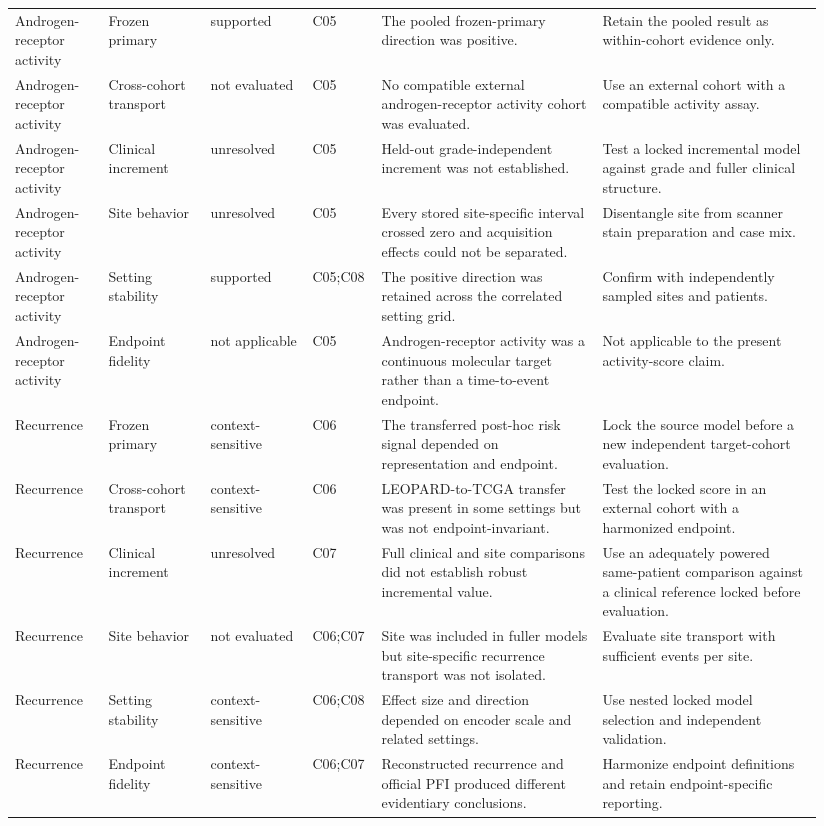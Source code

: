 \begin{longtable}{@{}p{0.11\linewidth}p{0.12\linewidth}p{0.12\linewidth}p{0.07\linewidth}p{0.26\linewidth}p{0.26\linewidth}@{}}
Androgen-receptor activity & Frozen primary & supported & C05 & The pooled frozen-primary direction was positive. & Retain the pooled result as within-cohort evidence only. \\
Androgen-receptor activity & Cross-cohort transport & not evaluated & C05 & No compatible external androgen-receptor activity cohort was evaluated. & Use an external cohort with a compatible activity assay. \\
Androgen-receptor activity & Clinical increment & unresolved & C05 & Held-out grade-independent increment was not established. & Test a locked incremental model against grade and fuller clinical structure. \\
Androgen-receptor activity & Site behavior & unresolved & C05 & Every stored site-specific interval crossed zero and acquisition effects could not be separated. & Disentangle site from scanner stain preparation and case mix. \\
Androgen-receptor activity & Setting stability & supported & C05;C08 & The positive direction was retained across the correlated setting grid. & Confirm with independently sampled sites and patients. \\
Androgen-receptor activity & Endpoint fidelity & not applicable & C05 & Androgen-receptor activity was a continuous molecular target rather than a time-to-event endpoint. & Not applicable to the present activity-score claim. \\
Recurrence & Frozen primary & context-sensitive & C06 & The transferred post-hoc risk signal depended on representation and endpoint. & Lock the source model before a new independent target-cohort evaluation. \\
Recurrence & Cross-cohort transport & context-sensitive & C06 & LEOPARD-to-TCGA transfer was present in some settings but was not endpoint-invariant. & Test the locked score in an external cohort with a harmonized endpoint. \\
Recurrence & Clinical increment & unresolved & C07 & Full clinical and site comparisons did not establish robust incremental value. & Use an adequately powered same-patient comparison against a clinical reference locked before evaluation. \\
Recurrence & Site behavior & not evaluated & C06;C07 & Site was included in fuller models but site-specific recurrence transport was not isolated. & Evaluate site transport with sufficient events per site. \\
Recurrence & Setting stability & context-sensitive & C06;C08 & Effect size and direction depended on encoder scale and related settings. & Use nested locked model selection and independent validation. \\
Recurrence & Endpoint fidelity & context-sensitive & C06;C07 & Reconstructed recurrence and official PFI produced different evidentiary conclusions. & Harmonize endpoint definitions and retain endpoint-specific reporting. \\
\bottomrule
\end{longtable}
\endgroup
